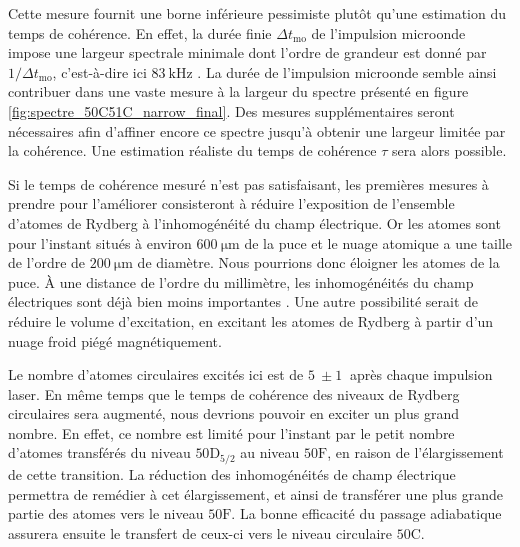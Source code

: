 Cette mesure fournit une borne inférieure pessimiste plutôt qu'une estimation du temps de cohérence.
En effet, la durée finie $\Delta t_{\text{mo}}$ de l'impulsion microonde impose une largeur spectrale minimale dont l'ordre de grandeur est donné par $1/\Delta t_{\text{mo}}$, c'est-à-dire ici $\SI{83}{\kHz}$ \cite{PHD_NGUYEN}.
La durée de l'impulsion microonde semble ainsi contribuer dans une vaste mesure à la largeur du spectre présenté en figure \eqref{fig:spectre_50C51C_narrow_final}.
Des mesures supplémentaires seront nécessaires afin d'affiner encore ce spectre jusqu'à obtenir une largeur limitée par la cohérence.
Une estimation réaliste du temps de cohérence $\tau$ sera alors possible.

Si le temps de cohérence mesuré n'est pas satisfaisant, les premières mesures à prendre pour l'améliorer consisteront à réduire l'exposition de l'ensemble d'atomes de Rydberg à l'inhomogénéité du champ électrique.
Or les atomes sont pour l'instant situés à environ $\SI{600}{\um}$ de la puce et le nuage atomique a une taille de l'ordre de $\SI{200}{\um}$ de diamètre.
Nous pourrions donc éloigner les atomes de la puce.
\`A une distance de l'ordre du millimètre, les inhomogénéités du champ électriques sont déjà bien moins importantes \cite{PHD_HERMANN}.
Une autre possibilité serait de réduire le volume d'excitation, en excitant les atomes de Rydberg à partir d'un nuage froid piégé magnétiquement.

Le nombre d'atomes circulaires excités ici est de $\SI{5}{}\pm\SI{1}{}$ après chaque impulsion laser.
En même temps que le temps de cohérence des niveaux de Rydberg circulaires sera augmenté, nous devrions pouvoir en exciter un plus grand nombre.
En effet, ce nombre est limité pour l'instant par le petit nombre d'atomes transférés du niveau $\mathrm{50D}_{5/2}$ au niveau $\mathrm{50F}$, en raison de l'élargissement de cette transition.
La réduction des inhomogénéités de champ électrique permettra de remédier à cet élargissement, et ainsi de transférer une plus grande partie des atomes vers le niveau $\mathrm{50F}$.
La bonne efficacité du passage adiabatique assurera ensuite le transfert de ceux-ci vers le niveau circulaire $\mathrm{50C}$.

